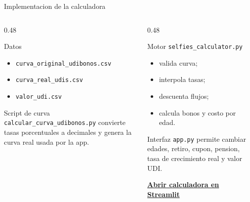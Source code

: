 \documentclass[aspectratio=169,11pt]{beamer}
\begin{document}
\begin{frame}{Implementacion de la calculadora}
  \begin{columns}[T]
    \begin{column}{0.48\textwidth}
      \begin{block}{Datos}
        \begin{itemize}
          \item \texttt{curva\_original\_udibonos.csv}
          \item \texttt{curva\_real\_udis.csv}
          \item \texttt{valor\_udi.csv}
        \end{itemize}
      \end{block}
      \begin{block}{Script de curva}
        \texttt{calcular\_curva\_udibonos.py} convierte tasas porcentuales a decimales y genera la curva real usada por la app.
      \end{block}
    \end{column}
    \begin{column}{0.48\textwidth}
      \begin{block}{Motor}
        \texttt{selfies\_calculator.py}
        \begin{itemize}
          \item valida curva;
          \item interpola tasas;
          \item descuenta flujos;
          \item calcula bonos y costo por edad.
        \end{itemize}
      \end{block}
      \begin{block}{Interfaz}
        \texttt{app.py} permite cambiar edades, retiro, cupon, pension, tasa de crecimiento real y valor UDI.

        \vspace{0.15cm}
        \href{https://lat4072-seguridad-social-y-pensiones-c4mkepuhxbkixxdd7ar96u.streamlit.app/}{\textbf{Abrir calculadora en Streamlit}}
      \end{block}
    \end{column}
  \end{columns}
\end{frame}
\end{document}
